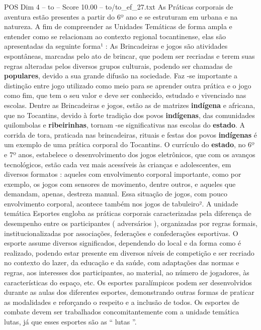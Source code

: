 \begin{textsample}{POS Dim 4 – to – Score 10.00 – to/to\_ef\_27.txt}
As Práticas corporais de aventura estão presentes a partir do 6º ano e se estruturam em urbana e na natureza.
A fim de compreender as Unidades Temáticas de forma ampla e entender como se relacionam ao contexto regional tocantinense, elas são apresentadas da seguinte forma¹ : As Brincadeiras e jogos são atividades espontâneas, marcadas pelo ato de brincar, que podem ser recriadas e terem suas regras alteradas pelos diversos grupos culturais, podendo ser chamadas de \textbf{populares}, devido a sua grande difusão na sociedade.
Faz -se importante a distinção entre jogo utilizado como meio para se aprender outra prática e o jogo como fim, que tem o seu valor e deve ser conhecido, estudado e vivenciado nas escolas.
Dentre as Brincadeiras e jogos, estão as de matrizes \textbf{indígena} e africana, que no Tocantins, devido à forte tradição dos povos \textbf{indígenas}, das comunidades quilombolas e \textbf{ribeirinhas}, tornam -se significativas nas escolas do \textbf{estado}.
A corrida de tora, praticada nas brincadeiras, rituais e festas dos povos \textbf{indígenas} é um exemplo de uma prática corporal do Tocantins.
O currículo do \textbf{estado}, no 6º e 7º anos, estabelece o desenvolvimento dos jogos eletrônicos, que com os avanços tecnológicos, estão cada vez mais acessíveis às crianças e adolescentes, em diversos formatos : aqueles com envolvimento corporal importante, como por exemplo, os jogos com sensores de movimento, dentre outros, e aqueles que demandam, apenas, destreza manual.
Essa situação de jogos, com pouco envolvimento corporal, acontece também nos jogos de tabuleiro².
A unidade temática Esportes engloba as práticas corporais caracterizadas pela diferença de desempenho entre os participantes ( adversários ), organizadas por regras formais, institucionalizadas por associações, federações e confederações esportivas.
O esporte assume diversos significados, dependendo do local e da forma como é realizado, podendo estar presente em diversos níveis de competição e ser recriado no contexto do lazer, da educação e da saúde, com adaptações das normas e regras, aos interesses dos participantes, ao material, ao número de jogadores, às características do espaço, etc.
Os esportes paralímpicos podem ser desenvolvidos durante as aulas dos diferentes esportes, demonstrando outras formas de praticar as modalidades e reforçando o respeito e a inclusão de todos.
Os esportes de combate devem ser trabalhados concomitantemente com a unidade temática lutas, já que esses esportes são as “ lutas ”.

\end{textsample}
